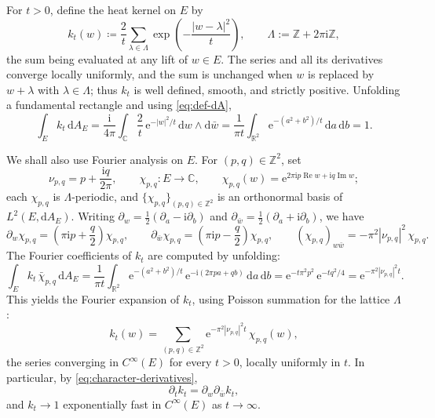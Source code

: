 \documentclass[11pt,a4paper]{article}
\begin{document}
	
	For $t>0$, define the heat kernel on $E$ by
	\begin{equation}
		k_t(w)\coloneqq \frac{2}{t}\sum_{\lambda\in\Lambda}
		\exp\left(-\frac{|w-\lambda|^2}{t}\right),
		\qquad
		\Lambda:=\mathbb Z+2\pi\mathrm{i}\mathbb Z,
		\label{eq:heat-kernel}
	\end{equation}
	the sum being evaluated at any lift of $w\in E$.  The series and all
	its derivatives converge locally uniformly, and the sum is unchanged
	when $w$ is replaced by $w+\lambda$ with $\lambda\in\Lambda$; thus
	$k_t$ is well defined, smooth, and strictly positive.  Unfolding a
	fundamental rectangle and using \eqref{eq:def-dA},
	\[
	\int_E k_t\,\mathrm{d}A_E
	=\frac{\mathrm{i}}{4\pi}\int_{\mathbb C}\frac2t\,
	\mathrm{e}^{-|w|^2/t}\,\mathrm{d}w\wedge \mathrm{d}\bar w
	=\frac{1}{\pi t}\int_{\mathbb R^2}\mathrm{e}^{-(a^2+b^2)/t}
	\,\mathrm{d}a\,\mathrm{d}b=1 .
	\]
	
	We shall also use Fourier analysis on $E$.  For
	$(p,q)\in\mathbb Z^2$, set
	\[
	\nu_{p,q}=p+\frac{\mathrm{i}q}{2\pi},
	\qquad
	\chi_{p,q}\colon E\to\mathbb C,
	\qquad
	\chi_{p,q}(w)
	=\mathrm{e}^{2\pi\mathrm{i}p\operatorname{Re}w
		+\mathrm{i}q\operatorname{Im}w};
	\]
	each $\chi_{p,q}$ is $\Lambda$-periodic, and
	$\{\chi_{p,q}\}_{(p,q)\in\mathbb Z^2}$ is an orthonormal basis of
	$L^2(E,\mathrm{d}A_E)$. Writing
	$\partial_w=\tfrac12(\partial_a-\mathrm{i}\partial_b)$ and
	$\partial_{\bar w}=\tfrac12(\partial_a+\mathrm{i}\partial_b)$, we
	have
	\begin{equation}
		\partial_w\chi_{p,q}
		=\left(\pi\mathrm{i}p+\frac q2\right)\chi_{p,q},
		\qquad
		\partial_{\bar w}\chi_{p,q}
		=\left(\pi\mathrm{i}p-\frac q2\right)\chi_{p,q},
		\qquad
		(\chi_{p,q})_{w\bar w}=-\pi^2|\nu_{p,q}|^2\,\chi_{p,q}.
		\label{eq:character-derivatives}
	\end{equation}
	The Fourier coefficients of $k_t$ are computed by unfolding:
	\[
	\int_E k_t\,\bar\chi_{p,q}\,\mathrm{d}A_E
	=\frac{1}{\pi t}\int_{\mathbb R^2}
	\mathrm{e}^{-(a^2+b^2)/t}\,
	\mathrm{e}^{-\mathrm{i}(2\pi pa+qb)}\,\mathrm{d}a\,\mathrm{d}b
	=\mathrm{e}^{-t\pi^2p^2}\,\mathrm{e}^{-tq^2/4}
	=\mathrm{e}^{-\pi^2|\nu_{p,q}|^2t}.
	\]
	This yields the Fourier expansion
	of $k_t$, using Poisson summation for the lattice $\Lambda$:
	\begin{equation}
		k_t(w)=\sum_{(p,q)\in\mathbb Z^2}
		\mathrm{e}^{-\pi^2|\nu_{p,q}|^2t}\,\chi_{p,q}(w),
		\label{eq:heat-Fourier}
	\end{equation}
	the series converging in $C^\infty(E)$ for every $t>0$, locally
	uniformly in $t$.  In particular, by
	\eqref{eq:character-derivatives},
	\begin{equation}
		\partial_t k_t=\partial_w\partial_{\bar w}k_t ,
		\label{eq:heat-equation}
	\end{equation}
	and $k_t\to1$ exponentially fast in $C^\infty(E)$ as $t\to\infty$.
	
\end{document}
